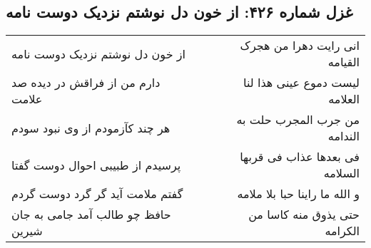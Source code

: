 \begin{center}
\section*{غزل شماره ۴۲۶: از خون دل نوشتم نزدیک دوست نامه}
\label{sec:sh426}
\begin{longtable}{l p{0.5cm} r}
از خون دل نوشتم نزدیک دوست نامه
&&
انی رایت دهرا من هجرک القیامه
\\
دارم من از فراقش در دیده صد علامت
&&
لیست دموع عینی هذا لنا العلامه
\\
هر چند کآزمودم از وی نبود سودم
&&
من جرب المجرب حلت به الندامه
\\
پرسیدم از طبیبی احوال دوست گفتا
&&
فی بعدها عذاب فی قربها السلامه
\\
گفتم ملامت آید گر گرد دوست گردم
&&
و الله ما راینا حبا بلا ملامه
\\
حافظ چو طالب آمد جامی به جان شیرین
&&
حتی یذوق منه کاسا من الکرامه
\\
\end{longtable}
\end{center}
